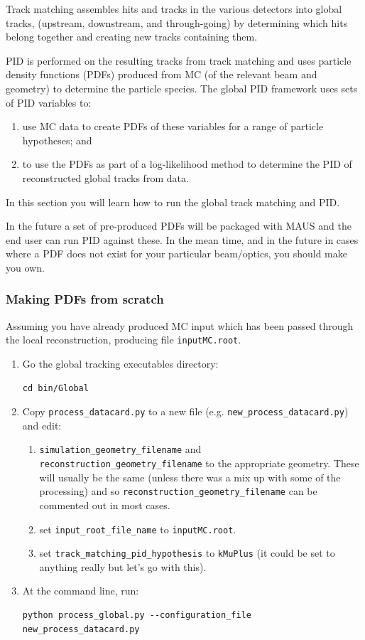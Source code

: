 \documentclass[a4paper,10pt]{article}
\begin{document}
Track matching assembles hits and tracks in the various detectors into global tracks, (upstream, downstream, and through-going) by determining which hits belong together and creating new tracks containing them.

PID is performed on the resulting tracks from track matching and uses particle density functions (PDFs) produced from MC (of the relevant beam and geometry) to determine the particle species.  The global PID framework uses sets of PID variables to: 
\begin{enumerate}
\item use MC data to create PDFs of these variables for a range of particle hypotheses; and
\item to use the PDFs as part of a log-likelihood method to determine the PID of reconstructed global tracks from data. 
\end{enumerate}

In this section you will learn how to run the global track matching and PID.

In the future a set of pre-produced PDFs will be packaged with MAUS and the end user can run PID against these.  In the mean time, and in the future in cases where a PDF does not exist for your particular beam/optics, you should make you own.  

\subsubsection{Making PDFs from scratch}
Assuming you have already produced MC input which has been passed through the local reconstruction, producing file \texttt{inputMC.root}.

\begin{enumerate}
\item Go the global tracking executables directory:
\begin{lstlisting}
cd bin/Global
\end{lstlisting}

\item Copy \texttt{process\_datacard.py} to a new file (e.g. \texttt{new\_process\_datacard.py}) and edit:
\begin{enumerate}[label=(\alph*)]
\item{\texttt{simulation\_geometry\_filename} and \texttt{reconstruction\_geometry\_filename} to the
appropriate geometry.  These will usually be the same (unless there was a mix up with some of the processing) and so \texttt{reconstruction\_geometry\_filename} can be commented out in most cases.}
\item{set \texttt{input\_root\_file\_name} to \texttt{inputMC.root}.}
\item{set \texttt{track\_matching\_pid\_hypothesis} to \texttt{kMuPlus} (it could be set to anything really but let's go with this).}
\end{enumerate} 
\item At the command line, run:
\begin{lstlisting}
python process_global.py --configuration_file new_process_datacard.py
\end{lstlisting}
\end{enumerate}
\end{document}
